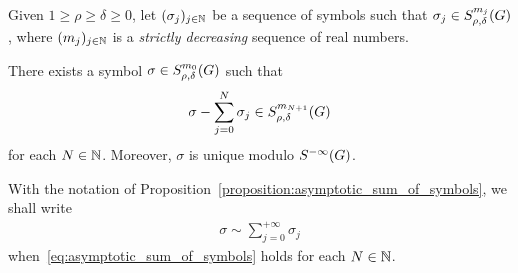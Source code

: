 \begin{proposition}
\label{proposition:asymptotic_sum_of_symbols}
    Given $1 \geq \rho \geq \delta \geq 0$,
    let $(\sigma_j)_{j \in \mathbb{N}}$ be a sequence of symbols such that $\sigma_j \in S^{m_j}_{\rho, \delta}(G)$,
    where $(m_j)_{j \in \mathbb{N}}$ is a \emph{strictly decreasing} sequence of real numbers.

    There exists a symbol $\sigma \in S^{m_0}_{\rho, \delta}(G)$
    such that
    \begin{align}
        \sigma - \sum_{j = 0}^N \sigma_j \in S^{m_{N + 1}}_{\rho, \delta}(G)
        \label{eq:asymptotic_sum_of_symbols}
    \end{align}
    for each $N \in \mathbb{N}$.
    Moreover, $\sigma$ is unique modulo ${S^{-\infty} (G)}$.
\end{proposition}

\begin{definition}
    With the notation of Proposition~\ref{proposition:asymptotic_sum_of_symbols},
    we shall write
    \begin{align*}
        \sigma \sim \sum_{j = 0}^{+\infty} \sigma_j
    \end{align*}
    when~\eqref{eq:asymptotic_sum_of_symbols} holds for each $N \in \mathbb{N}$.
\end{definition}

